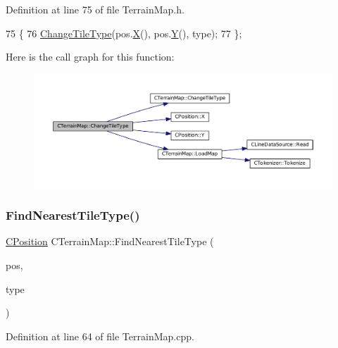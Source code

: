 Definition at line 75 of file Terrain\+Map.\+h.


\begin{DoxyCode}
75                                                                  \{
76             \hyperlink{classCTerrainMap_a40757d66d7458620a327d6f69a35a2bd}{ChangeTileType}(pos.\hyperlink{classCPosition_a9a6b94d3b91df1492d166d9964c865fc}{X}(), pos.\hyperlink{classCPosition_a1aa8a30e2f08dda1f797736ba8c13a87}{Y}(), type);
77         \};
\end{DoxyCode}
Here is the call graph for this function\+:
\nopagebreak
\begin{figure}[H]
\begin{center}
\leavevmode
\includegraphics[width=350pt]{classCTerrainMap_a4a4f26c13a3d8116f4295bef3c25c3e5_cgraph}
\end{center}
\end{figure}
\hypertarget{classCTerrainMap_af32811cace3a3b01c9519b304ddb8efc}{}\label{classCTerrainMap_af32811cace3a3b01c9519b304ddb8efc} 
\subsubsection{\texorpdfstring{Find\+Nearest\+Tile\+Type()}{FindNearestTileType()}}
{\footnotesize\ttfamily \hyperlink{classCPosition}{C\+Position} C\+Terrain\+Map\+::\+Find\+Nearest\+Tile\+Type (\begin{DoxyParamCaption}\item[{const \hyperlink{classCPosition}{C\+Position} \&}]{pos,  }\item[{\hyperlink{classCTerrainMap_aff2ab991e237269941416dd79d8871d4}{E\+Tile\+Type}}]{type }\end{DoxyParamCaption})}



Definition at line 64 of file Terrain\+Map.\+cpp.


